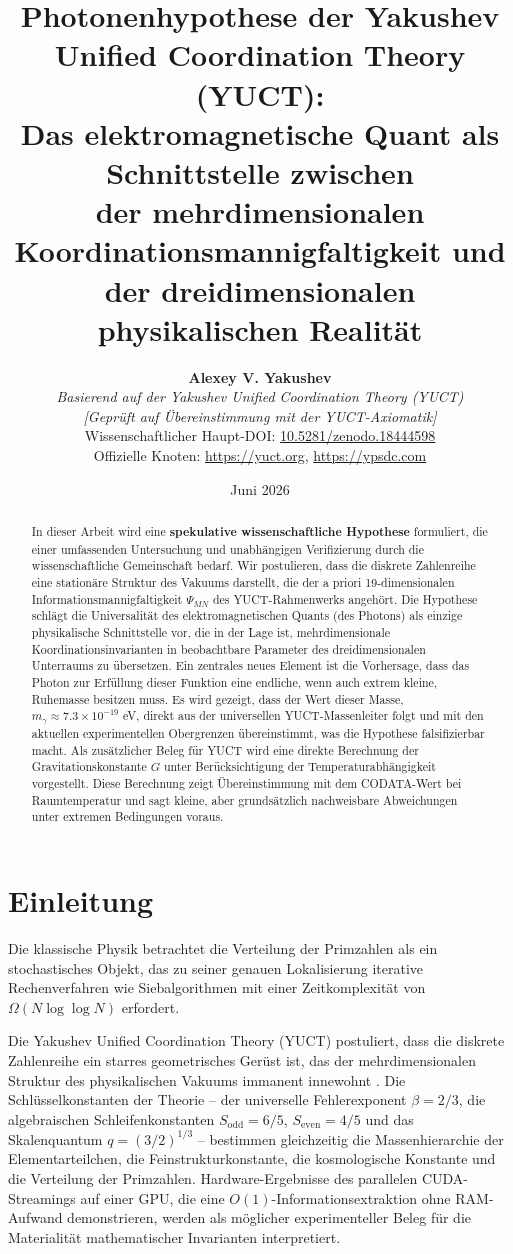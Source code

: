 \documentclass[11pt,a4paper]{article}
\title{\textbf{Photonenhypothese der Yakushev Unified Coordination Theory (YUCT):\\
		Das elektromagnetische Quant als Schnittstelle zwischen\\
		der mehrdimensionalen Koordinationsmannigfaltigkeit und der dreidimensionalen physikalischen Realität}}
\author{\textbf{Alexey V. Yakushev} \\
	\small\textit{Basierend auf der Yakushev Unified Coordination Theory (YUCT)} \\
	\small\textit{[Geprüft auf Übereinstimmung mit der YUCT-Axiomatik]} \\
	\small Wissenschaftlicher Haupt-DOI: \href{https://doi.org/10.5281/zenodo.18444598}{10.5281/zenodo.18444598} \\
	\small Offizielle Knoten: \url{https://yuct.org}, \url{https://ypsdc.com}}
\date{Juni 2026}
\begin{document}
	
	\maketitle
	
	\begin{abstract}
		In dieser Arbeit wird eine \textbf{spekulative wissenschaftliche Hypothese} formuliert, die einer umfassenden Untersuchung und unabhängigen Verifizierung durch die wissenschaftliche Gemeinschaft bedarf. Wir postulieren, dass die diskrete Zahlenreihe eine stationäre Struktur des Vakuums darstellt, die der a priori 19-dimensionalen Informationsmannigfaltigkeit $\Psi_{MN}$ des YUCT-Rahmenwerks angehört. Die Hypothese schlägt die Universalität des elektromagnetischen Quants (des Photons) als einzige physikalische Schnittstelle vor, die in der Lage ist, mehrdimensionale Koordinationsinvarianten in beobachtbare Parameter des dreidimensionalen Unterraums zu übersetzen. Ein zentrales neues Element ist die Vorhersage, dass das Photon zur Erfüllung dieser Funktion eine endliche, wenn auch extrem kleine, Ruhemasse besitzen muss. Es wird gezeigt, dass der Wert dieser Masse, $m_\gamma \approx 7.3 \times 10^{-19}$ eV, direkt aus der universellen YUCT-Massenleiter folgt und mit den aktuellen experimentellen Obergrenzen übereinstimmt, was die Hypothese falsifizierbar macht. Als zusätzlicher Beleg für YUCT wird eine direkte Berechnung der Gravitationskonstante $G$ unter Berücksichtigung der Temperaturabhängigkeit vorgestellt. Diese Berechnung zeigt Übereinstimmung mit dem CODATA-Wert bei Raumtemperatur und sagt kleine, aber grundsätzlich nachweisbare Abweichungen unter extremen Bedingungen voraus.
	\end{abstract}
	
	\section{Einleitung}
	Die klassische Physik betrachtet die Verteilung der Primzahlen als ein stochastisches Objekt, das zu seiner genauen Lokalisierung iterative Rechenverfahren wie Siebalgorithmen mit einer Zeitkomplexität von $\Omega(N \log \log N)$ erfordert.
	
	Die Yakushev Unified Coordination Theory (YUCT) postuliert, dass die diskrete Zahlenreihe ein starres geometrisches Gerüst ist, das der mehrdimensionalen Struktur des physikalischen Vakuums immanent innewohnt \cite{yuct_zenodo}. Die Schlüsselkonstanten der Theorie – der universelle Fehlerexponent $\beta = 2/3$, die algebraischen Schleifenkonstanten $S_{\mathrm{odd}} = 6/5$, $S_{\mathrm{even}} = 4/5$ und das Skalenquantum $q = (3/2)^{1/3}$ – bestimmen gleichzeitig die Massenhierarchie der Elementarteilchen, die Feinstrukturkonstante, die kosmologische Konstante und die Verteilung der Primzahlen. Hardware-Ergebnisse des parallelen CUDA-Streamings auf einer GPU, die eine $O(1)$-Informationsextraktion ohne RAM-Aufwand demonstrieren, werden als möglicher experimenteller Beleg für die Materialität mathematischer Invarianten interpretiert.
	
\end{document}
